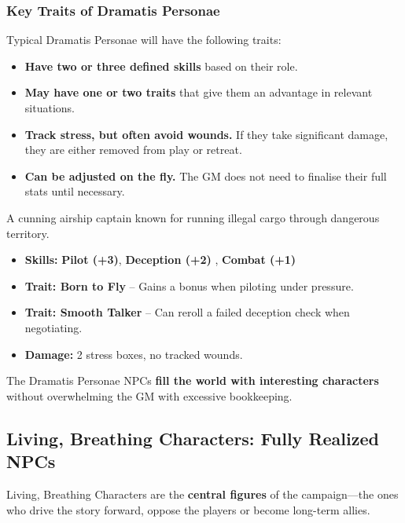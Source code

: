 \subsubsection{Key Traits of Dramatis Personae}
Typical Dramatis Personae will have the following traits:
\begin{itemize}
    \item \textbf{Have two or three defined skills} based on their role.
    \item \textbf{May have one or two traits} that give them an advantage in relevant situations.
    \item \textbf{Track stress, but often avoid wounds.} If they take significant damage, they are either removed from play or retreat.
    \item \textbf{Can be adjusted on the fly.} The GM does not need to finalise their full stats until necessary.
\end{itemize}

\begin{WyrdExample}
	A cunning airship captain known for running illegal cargo through dangerous territory.
	\begin{itemize}
    	\item \textbf{Skills:} \textbf{Pilot (+3)}, \textbf{Deception (+2)} , \textbf{Combat (+1)} 
	    \item \textbf{Trait: Born to Fly} – Gains a bonus when piloting under pressure.
        \item \textbf{Trait: Smooth Talker} – Can reroll a failed deception check when negotiating.
    	\item \textbf{Damage:} 2 stress boxes, no tracked wounds.
	\end{itemize}
\end{WyrdExample}

The Dramatis Personae NPCs \textbf{fill the world with interesting characters} without overwhelming the GM with excessive bookkeeping.

\subsection{Living, Breathing Characters: Fully Realized NPCs}

Living, Breathing Characters are the \textbf{central figures} of the campaign—the ones who drive the story forward, oppose the players or become long-term allies.

